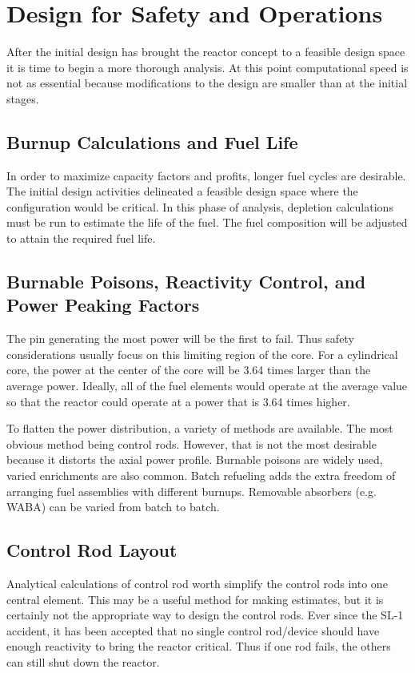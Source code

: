 \chapter{Design for Safety and Operations}

After the initial design has brought the reactor concept to a feasible design space it is time to begin a more thorough analysis.
At this point computational speed is not as essential because modifications to the design are smaller than at the initial stages.

\section{Burnup Calculations and Fuel Life}
In order to maximize capacity factors and profits, longer fuel cycles are desirable. 
The initial design activities delineated a feasible design space where the configuration would be critical. In this phase of analysis, depletion calculations must be run to estimate the life of the fuel. The fuel composition will be adjusted to attain the required fuel life.


\section{Burnable Poisons, Reactivity Control, and Power Peaking Factors}

The pin generating the most power will be the first to fail. Thus safety considerations usually focus on this limiting region of the core. For a cylindrical core, the power at the center of the core will be 3.64 times larger than the average power. 
Ideally, all of the fuel elements would operate at the average value so that the reactor could operate at a power that is 3.64 times higher.

To flatten the power distribution, a variety of methods are available. 
The most obvious method being control rods. However, that is not the most desirable because it distorts the axial power profile.
Burnable poisons are widely used, varied enrichments are also common. 
Batch refueling adds the extra freedom of arranging fuel assemblies with different burnups. 
Removable absorbers (e.g. WABA) can be varied from batch to batch.


\section{Control Rod Layout}
Analytical calculations of control rod worth simplify the control rods into one central element. This may be a useful method for making estimates, but it is certainly not the appropriate way to design the control rods.
Ever since the SL-1 accident, it has been accepted that no single control rod/device should have enough reactivity to bring the reactor critical. Thus if one rod fails, the others can still shut down the reactor.


